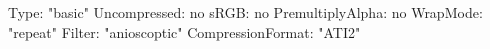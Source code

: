 Type: "basic"
Uncompressed: no
sRGB: no
PremultiplyAlpha: no
WrapMode: "repeat"
Filter: "anioscoptic"
CompressionFormat: "ATI2"
